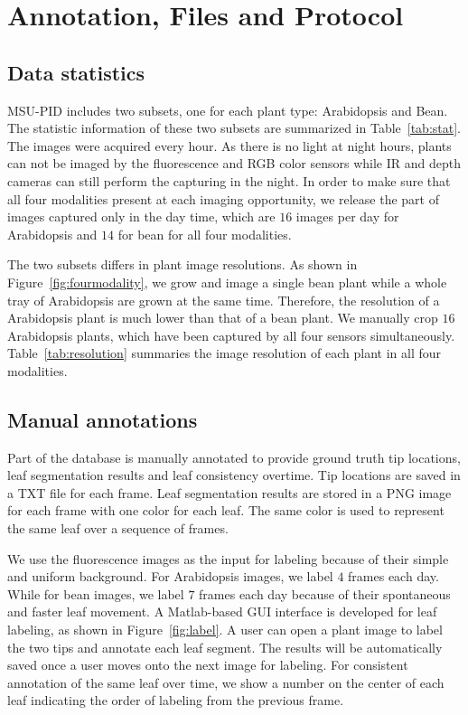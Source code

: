 \section{Annotation, Files and Protocol}
\subsection{Data statistics}
MSU-PID includes two subsets, one for each plant type: Arabidopsis and Bean.
The statistic information of these two subsets are summarized in Table~\ref{tab:stat}.
The images were acquired every hour.
As there is no light at night hours, plants can not be imaged by the fluorescence and RGB color sensors while IR and depth cameras can still perform the capturing in the night.
In order to make sure that all four modalities present at each imaging opportunity, we release the part of images captured only in the day time, which are $16$ images per day for Arabidopsis and $14$ for bean for all four modalities.



The two subsets differs in plant image resolutions.
As shown in Figure~\ref{fig:fourmodality}, we grow and image a single bean plant while a whole tray of Arabidopsis are grown at the same time.
Therefore, the resolution of a Arabidopsis plant is much lower than that of a bean plant.
We manually crop $16$ Arabidopsis plants, which have been captured by all four sensors simultaneously.
Table~\ref{tab:resolution} summaries the image resolution of each plant in all four modalities.



\subsection{Manual annotations}
Part of the database is manually annotated to provide ground truth tip locations, leaf segmentation results and leaf consistency overtime.
Tip locations are saved in a TXT file for each frame.
Leaf segmentation results are stored in a PNG image for each frame with one color for each leaf.
The same color is used to represent the same leaf over a sequence of frames.

We use the fluorescence images as the input for labeling because of their simple and uniform background.
For Arabidopsis images, we label $4$ frames each day.
While for bean images, we label $7$ frames each day because of their spontaneous and faster leaf movement.
A Matlab-based GUI interface is developed for leaf labeling, as shown in Figure~\ref{fig:label}.
A user can open a plant image to label the two tips and annotate each leaf segment.
The results will be automatically saved once a user moves onto the next image for labeling.
For consistent annotation of the same leaf over time, we show a number on the center of each leaf indicating the order of labeling from the previous frame.

